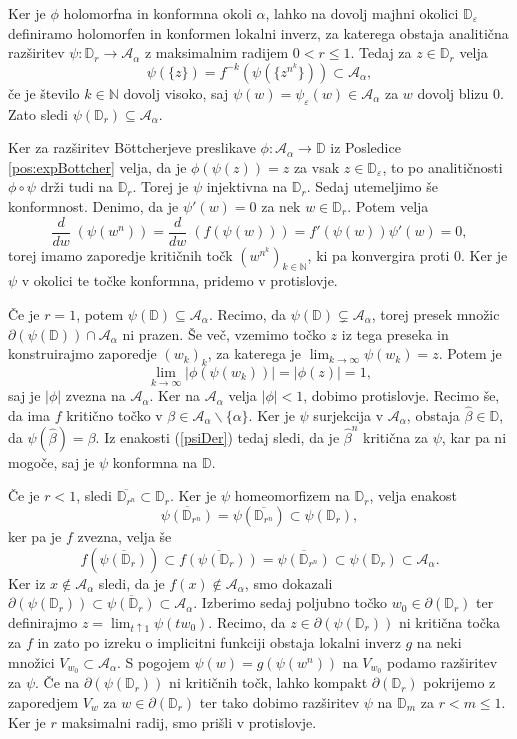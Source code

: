 \documentclass[12pt,a4paper]{amsart}
\theoremstyle{definition} %
\theoremstyle{plain} %
\newcommand{\N}{\mathbb N}
\newcommand{\D}{\mathbb D} %
\newcommand{\A}{\mathscr A} %
\begin{document}
\proof
Ker je $\phi$ holomorfna in konformna okoli $\alpha$, 
lahko na dovolj majhni okolici $\D_\varepsilon$ definiramo holomorfen in konformen lokalni inverz,
za katerega obstaja analitična razširitev $\psi \colon \D_r \to \A_\alpha$ z maksimalnim radijem $0 < r \leq 1$.
Tedaj za $z\in\D_r$ velja
$$\psi(\{z\}) = f^{-k}(\psi(\{z^{n^k}\})) \subset \A_\alpha,$$
če je število $k\in\N$ dovolj visoko, saj $\psi(w) = \psi_\varepsilon(w) \in \A_\alpha$ za $w$ dovolj blizu $0$.
Zato sledi $\psi(\D_r) \subseteq \A_\alpha$.

Ker za razširitev B{\"o}ttcherjeve preslikave $\phi \colon \A_\alpha \to \D$ iz Posledice \ref{pos:expBottcher} velja, 
da je $\phi(\psi(z)) = z$ za vsak $z\in\D_\varepsilon$, to po analitičnosti $\phi \circ \psi$ drži tudi na $\D_r$.
Torej je $\psi$ injektivna na $\D_r$.
Sedaj utemeljimo še konformnost. 
Denimo, da je $\psi'(w) = 0$ za nek $w\in\D_r$. Potem velja
\begin{equation}\label{psiDer}
\frac{d}{dw} \; (\psi(w^n)) = \frac{d}{dw} \; (f(\psi(w))) = f'(\psi(w)) \psi'(w) = 0,
\end{equation}
torej imamo zaporedje kritičnih točk $(w^{n^k})_{k\in\N}$, ki pa konvergira proti $0$.
Ker je $\psi$ v okolici te točke konformna, pridemo v protislovje.

Če je $r=1$, potem $\psi(\D) \subseteq \A_\alpha$. Recimo, da $\psi(\D) \subsetneq \A_\alpha$, 
torej presek množic $\partial(\psi(\D)) \cap \A_\alpha$ ni prazen. 
Še več, vzemimo točko $z$ iz tega preseka in konstruirajmo zaporedje $(w_k)_k$, za katerega je $\lim_{k\to\infty}\psi(w_k) = z$.
Potem je $$\lim_{k\to\infty}|\phi(\psi(w_k))| = |\phi(z)| = 1,$$ 
saj je $|\phi|$ zvezna na $\A_\alpha$. Ker na $\A_\alpha$ velja $|\phi| < 1$, dobimo protislovje.
Recimo še, da ima $f$ kritično točko v $\beta \in \A_\alpha \smallsetminus \{\alpha\}$. 
Ker je $\psi$ surjekcija v $\A_\alpha$, obstaja $\hat{\beta} \in \D$, da $\psi(\hat{\beta}) = \beta$.
Iz enakosti (\ref{psiDer}) tedaj sledi, da je $\hat{\beta}^n$ kritična za $\psi$, 
kar pa ni mogoče, saj je $\psi$ konformna na $\D$.

Če je $r < 1$, sledi $\overline{\D_{r^n}} \subset \D_r$. 
Ker je $\psi$ homeomorfizem na $\D_r$, velja enakost
$$\overline{\psi(\D_{r^n})} = \psi(\overline{\D_{r^n}})  \subset \psi(\D_r),$$
ker pa je $f$ zvezna, velja še 
$$f(\overline{\psi(\D_r)}) \subset \overline{f(\psi(\D_r))} = 
\overline{\psi(\D_{r^n})} \subset \psi(\D_r) \subset \A_\alpha.$$
Ker iz $x\notin\A_\alpha$ sledi, da je $f(x) \notin \A_\alpha$, 
smo dokazali $\partial(\psi(\D_r)) \subset \overline{\psi(\D_r)} \subset \A_\alpha$.
Izberimo sedaj poljubno točko $w_0 \in \partial(\D_r)$ ter definirajmo $z = \lim_{t\uparrow1} \psi(tw_0)$.
Recimo, da $z \in \partial(\psi(\D_r))$ ni kritična točka za $f$ in zato po izreku o implicitni funkciji 
obstaja lokalni inverz $g$ na neki množici $V_{w_0} \subset \A_\alpha$.
S pogojem $\psi(w) = g(\psi(w^n))$ na $V_{w_0}$ podamo razširitev za $\psi$. 
Če na $\partial(\psi(\D_r))$ ni kritičnih točk, lahko kompakt $\partial(\D_r)$ pokrijemo z 
zaporedjem $V_w$ za $w \in \partial(\D_r)$ ter tako dobimo razširitev $\psi$ na $\D_m$ za $r < m \leq 1$.
Ker je $r$ maksimalni radij, smo prišli v protislovje.
\endproof
\end{document}
